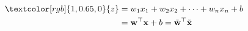 \documentclass[preview]{standalone}
\begin{document}
\begin{align}
\textcolor[rgb]{1,0.65,0}{z} &= w_1 x_1 + w_2 x_2 + \dots + w_n x_n + b \\ &= \mathbf{w}^\top \mathbf{x} + b = \tilde{\mathbf{w}}^\top \tilde{\mathbf{x}}
\end{align}
\end{document}
